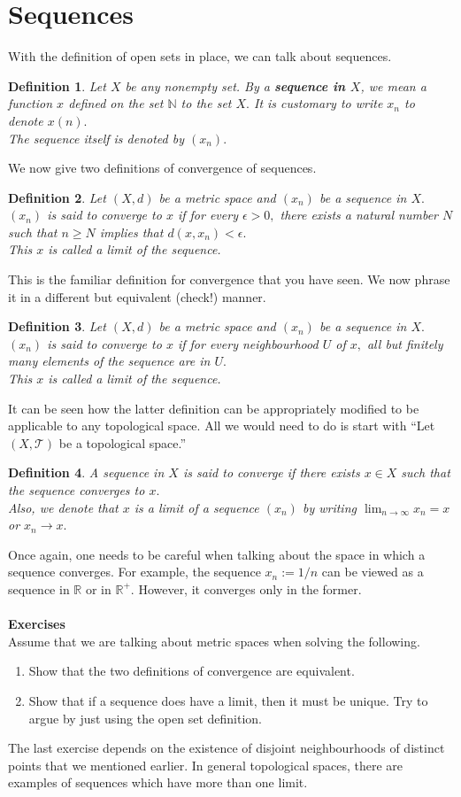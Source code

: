 \documentclass{article}
\newtheorem{defn}{Definition}
\begin{document}
	\section{Sequences}
	With the definition of open sets in place, we can talk about sequences.
	\begin{defn}
		Let $X$ be any nonempty set. By a \textbf{sequence in $X$}, we mean a function $x$ defined on the set $\mathbb{N}$ to the set $X.$ It is customary to write $x_n$ to denote $x(n).$\\
		The sequence itself is denoted by $(x_n).$
	\end{defn}
	We now give two definitions of convergence of sequences.
	\begin{defn}
		Let $(X, d)$ be a metric space and $(x_n)$ be a sequence in $X.$\\
		$(x_n)$ is said to converge to $x$ if for every $\epsilon > 0,$ there exists a natural number $N$ such that $n \ge N$ implies that $d(x, x_n) < \epsilon.$\\
		This $x$ is called a limit of the sequence.
	\end{defn}
	This is the familiar definition for convergence that you have seen. We now phrase it in a different but equivalent (check!) manner.
	\begin{defn}
		Let $(X, d)$ be a metric space and $(x_n)$ be a sequence in $X.$\\
		$(x_n)$ is said to converge to $x$ if for every neighbourhood $U$ of $x,$ all but finitely many elements of the sequence are in $U.$\\
		This $x$ is called a limit of the sequence.
	\end{defn}
	It can be seen how the latter definition can be appropriately modified to be applicable to any topological space. All we would need to do is start with ``Let $(X, \mathcal{T})$ be a topological space.''
	\begin{defn}
		A sequence in $X$ is said to converge if there exists $x \in X$ such that the sequence converges to $x.$\\
		Also, we denote that $x$ is a limit of a sequence $(x_n)$ by writing $\displaystyle\lim_{n\to \infty}x_n = x$ or $x_n \to x.$
	\end{defn}
	Once again, one needs to be careful when talking about the space in which a sequence converges. For example, the sequence $x_n := 1/n$ can be viewed as a sequence in $\mathbb{R}$ or in $\mathbb{R}^+.$ However, it converges only in the former.\\~\\
	\textbf{Exercises}\\
	Assume that we are talking about metric spaces when solving the following.
	\begin{enumerate}[nosep]
		\item Show that the two definitions of convergence are equivalent.
		\item Show that if a sequence does have a limit, then it must be unique. Try to argue by just using the open set definition.
	\end{enumerate}
	The last exercise depends on the existence of disjoint neighbourhoods of distinct points that we mentioned earlier. In general topological spaces, there are examples of sequences which have more than one limit.
\end{document}
